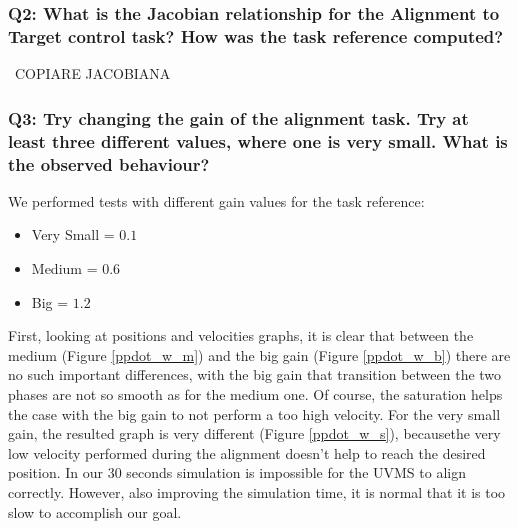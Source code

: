 \documentclass{article}
\newcommand{\ocio} {\marginpar{!}}
\newcommand{\no} {\marginpar{‡}}
\begin{document}
\subsubsection{Q2: What is the Jacobian relationship for the Alignment to Target control task? How was the task reference computed?} \
COPIARE JACOBIANA \ocio

\subsubsection{Q3: Try changing the gain of the alignment task. Try at least three different values, where one is very small. What is the observed behaviour?} \no
We performed tests with different gain values for the task reference:
\begin{itemize}
	\item Very Small = $0.1$
	\item Medium = $0.6$
	\item Big = $1.2$
\end{itemize}
First, looking at positions and velocities graphs, it is clear that between the medium (Figure \ref{ppdot_w_m}) and the big gain (Figure \ref{ppdot_w_b}) there are no such important differences, with the big gain that transition between the two phases are not so smooth as for the medium one. Of course, the saturation helps the case with the big gain to not perform a too high velocity. 
For the very small gain, the resulted graph is very different (Figure \ref{ppdot_w_s}), becausethe very low velocity performed during the alignment doesn't help to reach the desired position. In our 30 seconds simulation is impossible for the UVMS to align correctly. However, also improving the simulation time, it is normal that it is too slow to accomplish our goal.
\end{document}

